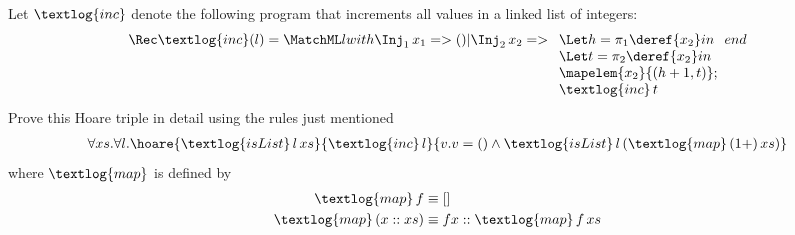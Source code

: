 \setcounter{exercise}{19}
\begin{exercise}
  Let $\textlog{inc}$ denote the following program that increments all values in a
  linked list of integers:
  \begin{align*}
    \Rec \textlog{inc}(l)= \MatchML l with
    \Inj_1\, x_1=>()
    | \Inj_2\, x_2=>
    \begin{array}[t]{l}
      \Let h=\pi_1 \deref{x_2} in \\
      \Let t=\pi_2 \deref{x_2} in \\
      \mapelem{x_2}{(h + 1, t)}; \\
      \textlog{inc}\, t
    \end{array}
    end {}
  \end{align*}
  Prove this Hoare triple in detail using the rules just mentioned
  \begin{align*}
    \forall xs. \forall l. \hoare{\textlog{isList}\, l\, xs}{\textlog{inc}\, l}
    {v.v = () \wedge \textlog{isList}\, l\, (\textlog{map}\, (1+)\, xs)}
  \end{align*}
  where $\textlog{map}$ is defined by
  \begin{align*}
    \textlog{map}\, f & \equiv [] \\
    \textlog{map}\, (x :: xs) & \equiv f x :: \textlog{map}\, f\, xs
  \end{align*}
\end{exercise}

